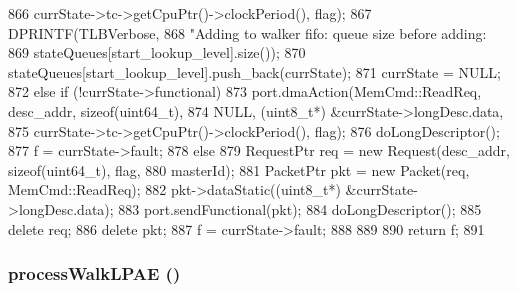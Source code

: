 \begin{DoxyCode}
{{866                        currState->tc->getCpuPtr()->clockPeriod(), flag);
867         DPRINTF(TLBVerbose,
868                 "Adding to walker fifo: queue size before adding: %
869                 stateQueues[start_lookup_level].size());
870         stateQueues[start_lookup_level].push_back(currState);
871         currState = NULL;
872     } else if (!currState->functional) {
873         port.dmaAction(MemCmd::ReadReq, desc_addr, sizeof(uint64_t),
874                        NULL, (uint8_t*) &currState->longDesc.data,
875                        currState->tc->getCpuPtr()->clockPeriod(), flag);
876         doLongDescriptor();
877         f = currState->fault;
878     } else {
879         RequestPtr req = new Request(desc_addr, sizeof(uint64_t), flag,
880                                      masterId);
881         PacketPtr pkt = new Packet(req, MemCmd::ReadReq);
882         pkt->dataStatic((uint8_t*) &currState->longDesc.data);
883         port.sendFunctional(pkt);
884         doLongDescriptor();
885         delete req;
886         delete pkt;
887         f = currState->fault;
888     }
889 
890     return f;
891 }
\end{DoxyCode}
\hypertarget{classArmISA_1_1TableWalker_a81c7003e58d3e96e25e66f221701669e}{
\subsubsection[{processWalkLPAE}]{ processWalkLPAE ()}}
\label{classArmISA_1_1TableWalker_a81c7003e58d3e96e25e66f221701669e}



